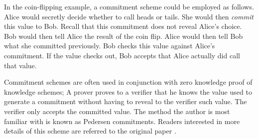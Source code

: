 In the coin-flipping example, a commitment scheme could be employed as follows. Alice would 
secretly decide whether to call heads or tails. She would then \textit{commit} this value to Bob. Recall
that this commitment does not reveal Alice's choice. Bob would then tell Alice the result of the coin
flip. Alice would then tell Bob what she committed previously. Bob checks this value against Alice's
commitment. If the value checks out, Bob accepts that Alice actually did call that value.

Commitment schemes are often used in conjunction with zero knowledge proof of knowledge schemes; 
A prover proves to a verifier that he knows the value used to generate a commitment without having to reveal
to the verifier such value. The verifier only accepts the committed value.
The method the author is most familiar with
is known as Pedersen commitments. Readers interested in more details of this scheme are referred
to the original paper \cite{pedersen}.

